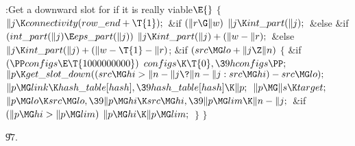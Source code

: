 \Y\B\4:Get a downward slot for  if it is really viable\X${}%
\E{}$\6
${}\{{}$\1\6
${}\|j\K\\{connectivity}(\\{row\_end}+\T{1});{}$\6
\&{if} ${}(\|r\G\|w){}$\1\5
${}\|j\K\\{int\_part}(\|j);{}$\2\6
\&{else} \&{if} ${}(\\{int\_part}(\|j)\E\\{eps\_part}(\|j)){}$\1\5
${}\|j\K\\{int\_part}(\|j)+(\|w-\|r);{}$\2\6
\&{else}\1\5
${}\|j\K\\{int\_part}(\|j)+(\|w-\T{1}-\|r){}$;\2\6
\&{if} ${}(\\{src}\MG\\{lo}+\|j\Z\|n){}$\5
${}\{{}$\1\6
\&{if} ${}(\PP\\{configs}\E\T{1000000000}){}$\1\5
${}\\{configs}\K\T{0},\39\\{hconfigs}\PP;{}$\2\6
${}\|p\K\\{get\_slot\_down}((\\{src}\MG\\{hi}>\|n-\|j\?\|n-\|j:\\{src}\MG%
\\{hi})-\\{src}\MG\\{lo});{}$\6
${}\|p\MG\\{link}\K\\{hash\_table}[\\{hash}],\39\\{hash\_table}[\\{hash}]\K%
\|p;{}$\6
${}\|p\MG\|s\K\\{target};{}$\6
${}\|p\MG\\{lo}\K\\{src}\MG\\{lo},\39\|p\MG\\{hi}\K\\{src}\MG\\{hi},\39\|p\MG%
\\{lim}\K\|n-\|j;{}$\6
\&{if} ${}(\|p\MG\\{hi}>\|p\MG\\{lim}){}$\1\5
${}\|p\MG\\{hi}\K\|p\MG\\{lim};{}$\2\6
\4${}\}{}$\2\6
\4${}\}{}$\2\par
\U97.\fi

